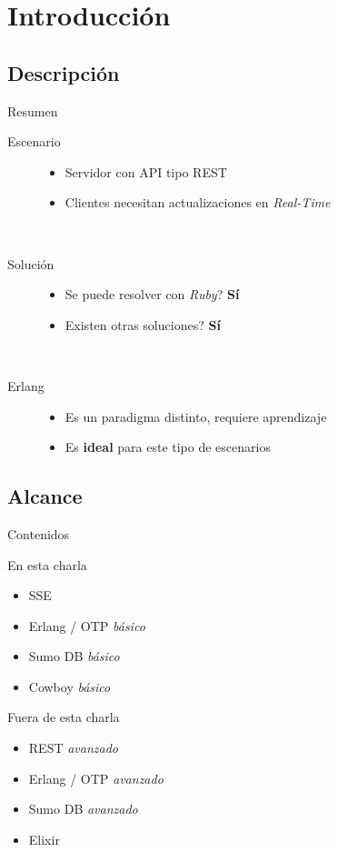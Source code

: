 \documentclass[utf8,hyperref={colorlinks=true}]{beamer}
\begin{document}
\section{Introducci\'on}
\subsection{Descripci\'on}
\begin{frame}{Resumen}

\begin{description}
	\item[Escenario]
		\begin{itemize}
			\item Servidor con API tipo REST
			\item Clientes necesitan actualizaciones en \emph{Real-Time}
		\end{itemize}
	\ \\
	\pause
	\item[Soluci\'on]
		\begin{itemize}
			\item Se puede resolver con \emph{Ruby}? \textbf{S\'i}
			\item Existen otras soluciones? \textbf{S\'i}
		\end{itemize}
	\ \\
	\pause
	\item[Erlang]
		\begin{itemize}
			\item Es un paradigma distinto, requiere aprendizaje
			\item Es \textbf{ideal} para este tipo de escenarios
		\end{itemize}
\end{description}

\end{frame}

\subsection{Alcance}
\begin{frame}{Contenidos}
\begin{multicols}{2}
	\alert{En esta charla}
		\begin{itemize} \itemsep1em
			\item<+-> SSE
			\item<+-> Erlang / OTP \emph{b\'asico}
			\item<+-> Sumo DB \emph{b\'asico}
			\item<+-> Cowboy \emph{b\'asico}
		\end{itemize}
\columnbreak
	\alert{Fuera de esta charla}
		\begin{itemize} \itemsep1em
			\item<+-> REST \emph{avanzado}
			\item<+-> Erlang / OTP \emph{avanzado}
			\item<+-> Sumo DB \emph{avanzado}
			\item<+-> Elixir
		\end{itemize}
\end{multicols}
\end{frame}
\end{document}
